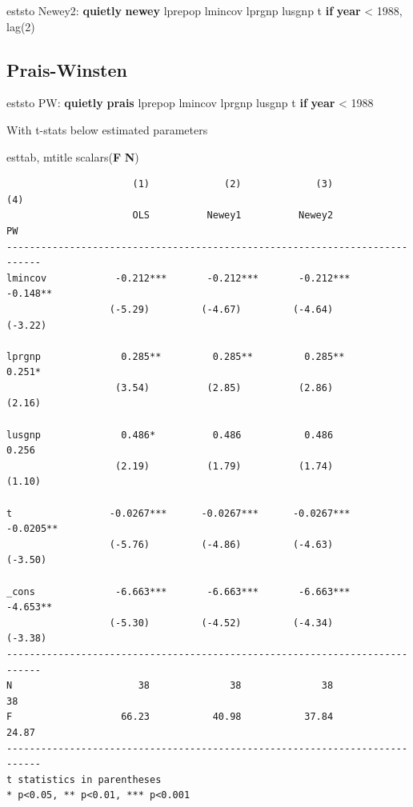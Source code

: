 \documentclass[
]{book}
\newenvironment{Shaded}{\begin{snugshade}}{\end{snugshade}}
\newcommand{\FunctionTok}[1]{\textcolor[rgb]{0.13,0.29,0.53}{\textbf{#1}}}
\newcommand{\KeywordTok}[1]{\textcolor[rgb]{0.13,0.29,0.53}{\textbf{#1}}}
\newcommand{\NormalTok}[1]{#1}
\begin{document}
\begin{Shaded}
\begin{Highlighting}[]
\NormalTok{eststo Newey2: }\KeywordTok{quietly} \KeywordTok{newey}\NormalTok{ lprepop lmincov lprgnp lusgnp t }\KeywordTok{if} \FunctionTok{year}\NormalTok{ \textless{} 1988, lag(2)}
\end{Highlighting}
\end{Shaded}

\subsection*{Prais-Winsten}\label{prais-winsten-2}

\begin{Shaded}
\begin{Highlighting}[]
\NormalTok{eststo PW: }\KeywordTok{quietly} \KeywordTok{prais}\NormalTok{ lprepop lmincov lprgnp lusgnp t }\KeywordTok{if} \FunctionTok{year}\NormalTok{ \textless{} 1988}
\end{Highlighting}
\end{Shaded}

With t-stats below estimated parameters

\begin{Shaded}
\begin{Highlighting}[]
\NormalTok{esttab, mtitle scalars(}\FunctionTok{F} \KeywordTok{N}\NormalTok{)}
\end{Highlighting}
\end{Shaded}

\begin{verbatim}
                      (1)             (2)             (3)             (4)   
                      OLS          Newey1          Newey2              PW   
----------------------------------------------------------------------------
lmincov            -0.212***       -0.212***       -0.212***       -0.148** 
                  (-5.29)         (-4.67)         (-4.64)         (-3.22)   

lprgnp              0.285**         0.285**         0.285**         0.251*  
                   (3.54)          (2.85)          (2.86)          (2.16)   

lusgnp              0.486*          0.486           0.486           0.256   
                   (2.19)          (1.79)          (1.74)          (1.10)   

t                 -0.0267***      -0.0267***      -0.0267***      -0.0205** 
                  (-5.76)         (-4.86)         (-4.63)         (-3.50)   

_cons              -6.663***       -6.663***       -6.663***       -4.653** 
                  (-5.30)         (-4.52)         (-4.34)         (-3.38)   
----------------------------------------------------------------------------
N                      38              38              38              38   
F                   66.23           40.98           37.84           24.87   
----------------------------------------------------------------------------
t statistics in parentheses
* p<0.05, ** p<0.01, *** p<0.001
\end{verbatim}
\end{document}
